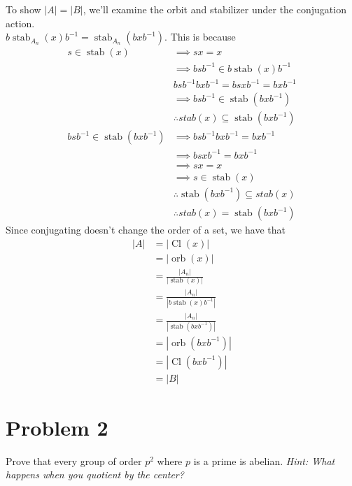 \documentclass[fleqn]{article}
\DeclareMathOperator{\orb}{orb}
\DeclareMathOperator{\stab}{stab}
\DeclareMathOperator{\Cl}{Cl}
\begin{document}
            To show $|A| = |B|$, we'll examine the orbit and stabilizer under the conjugation action. \\ $b\stab_{A_n}(x)b^{-1} = \stab_{A_n}(bxb^{-1})$.  This is because
            \begin{align}
                s \in \stab(x) &\implies sx = x \\
                    &\implies bsb^{-1} \in b\stab(x)b^{-1} \\
                    & bsb^{-1} bxb^{-1} = bsxb^{-1} = bxb^{-1} \\
                    &\implies bsb^{-1} \in \stab(bxb^{-1}) \\
                &\therefore{} stab(x) \subseteq \stab(bxb^{-1}) \\
                bsb^{-1} \in \stab(bxb^{-1}) &\implies bsb^{-1} bxb^{-1} = bxb^{-1} \\
                    &\implies bsxb^{-1} = bxb^{-1} \\
                    &\implies sx = x \\
                    &\implies s \in \stab(x) \\
                &\therefore{} \stab(bxb^{-1}) \subseteq stab(x) \\
                &\therefore{} stab(x) = \stab(bxb^{-1})
            \end{align}
            Since conjugating doesn't change the order of a set, we have that
            \begin{align}
                |A| &= |\Cl(x)| \\
                    &= |\orb(x)| \\
                    &= \frac{|A_n|}{|\stab(x)|} \\
                    &= \frac{|A_n|}{|b\stab(x)b^{-1}|} \\
                    &= \frac{|A_n|}{|\stab(bxb^{-1})|} \\
                    &= |\orb(bxb^{-1})| \\
                    &= |\Cl(bxb^{-1})| \\
                    &= |B|
            \end{align}
    
    \section{Problem 2}
    Prove that every group of order $p^2$ where $p$ is a prime is abelian.  \textit{Hint: What happens when you quotient by the center?}
        
\end{document}
